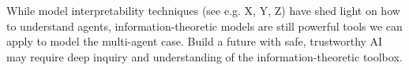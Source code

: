 \documentclass[11pt]{article}
\begin{document}

While model interpretability techniques (see e.g. X, Y, Z) have shed light on how to understand agents, information-theoretic models are still powerful tools we can apply to model the multi-agent case.  Build a future with safe, trustworthy AI may require deep inquiry and understanding of the information-theoretic toolbox.

\newpage


\nocite{*}

\end{document}
